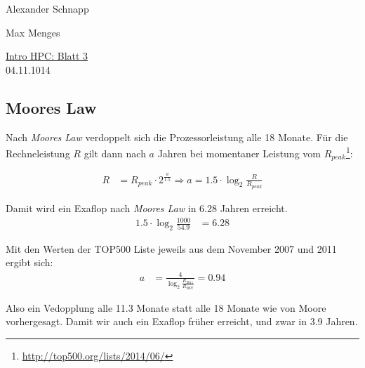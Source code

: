 \documentclass[a4paper,11pt]{scrartcl}
\begin{document}
\hfill Alexander Schnapp

\hfill Max Menges

\begin{center}
\underline{\Huge{Intro HPC: Blatt 3}}\\
\large{04.11.1014}\\
\end{center}


\subsection{Moores Law}
Nach \emph{Moores Law} verdoppelt sich die Prozessorleistung alle 18 Monate. Für die Rechneleistung $R$ gilt dann nach $a$ Jahren bei momentaner Leistung vom $R_{peak}$\footnote{\url{http://top500.org/lists/2014/06/}}:

\begin{align*}
R&=R_{peak}\cdot 2^{\frac{a}{1.5}} \Rightarrow a = 1.5\cdot \log_2{\frac{R}{R_{peak}}}
\end{align*}

Damit wird ein Exaflop nach \emph{Moores Law} in 6.28 Jahren erreicht.
\begin{align*}
1.5\cdot \log_2{\frac{1000}{54.9}}&=6.28
\end{align*}

Mit den Werten der TOP500 Liste jeweils aus dem November 2007 und 2011 ergibt sich:
\begin{align*}
    a&= \frac{4}{\log_2{\frac{R_{2011}}{R_{2007}}}}=0.94
\end{align*}

Also ein Vedopplung alle 11.3 Monate statt alle 18 Monate wie von Moore vorhergesagt. Damit wir auch ein Exaflop früher erreicht, und zwar in 3.9 Jahren.\\
\end{document}
